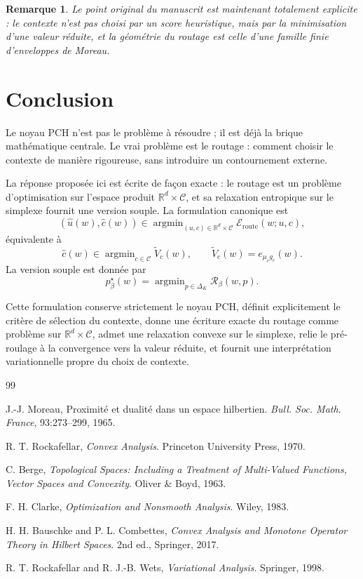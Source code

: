 \documentclass[11pt,a4paper]{article}
\newtheorem{remark}{Remarque}[section]
\DeclareMathOperator{\argmin}{argmin}
\newcommand{\R}{\mathbb R}
\newcommand{\Ccal}{\mathcal C}
\newcommand{\Rcal}{\mathcal R}
\begin{document}
\begin{remark}
Le point original du manuscrit est maintenant totalement explicite : le contexte n'est pas choisi par un score heuristique, mais par la minimisation d'une valeur réduite, et la géométrie du routage est celle d'une famille finie d'enveloppes de Moreau.
\end{remark}

\section{Conclusion}

Le noyau PCH n'est pas le problème à résoudre ; il est déjà la brique mathématique centrale. Le vrai problème est le routage : comment choisir le contexte de manière rigoureuse, sans introduire un contournement externe.

La réponse proposée ici est écrite de façon exacte : le routage est un problème d'optimisation sur l'espace produit \(\R^d\times\Ccal\), et sa relaxation entropique sur le simplexe fournit une version souple. La formulation canonique est
\[
(\hat u(w),\hat c(w))\in\argmin_{(u,c)\in\R^d\times\Ccal}\mathcal E_{\mathrm{route}}(w;u,c),
\]
équivalente à
\[
\hat c(w)\in\argmin_{c\in\Ccal}\widetilde V_c(w),
\qquad
\widetilde V_c(w)=e_{\mu_c g_c}(w).
\]
La version souple est donnée par
\[
 p^\star_\beta(w)
 =
\argmin_{p\in\Delta_K}\Rcal_\beta(w,p).
\]

Cette formulation conserve strictement le noyau PCH, définit explicitement le critère de sélection du contexte, donne une écriture exacte du routage comme problème sur \(\R^d\times\Ccal\), admet une relaxation convexe sur le simplexe, relie le pré-roulage à la convergence vers la valeur réduite, et fournit une interprétation variationnelle propre du choix de contexte.

\begin{thebibliography}{99}

J.-J. Moreau,
\newblock Proximité et dualité dans un espace hilbertien.
\newblock \emph{Bull. Soc. Math. France}, 93:273--299, 1965.

R. T. Rockafellar,
\newblock \emph{Convex Analysis}.
\newblock Princeton University Press, 1970.

C. Berge,
\newblock \emph{Topological Spaces: Including a Treatment of Multi-Valued Functions, Vector Spaces and Convexity}.
\newblock Oliver \& Boyd, 1963.

F. H. Clarke,
\newblock \emph{Optimization and Nonsmooth Analysis}.
\newblock Wiley, 1983.

H. H. Bauschke and P. L. Combettes,
\newblock \emph{Convex Analysis and Monotone Operator Theory in Hilbert Spaces}.
\newblock 2nd ed., Springer, 2017.

R. T. Rockafellar and R. J.-B. Wets,
\newblock \emph{Variational Analysis}.
\newblock Springer, 1998.

\end{thebibliography}
\end{document}
